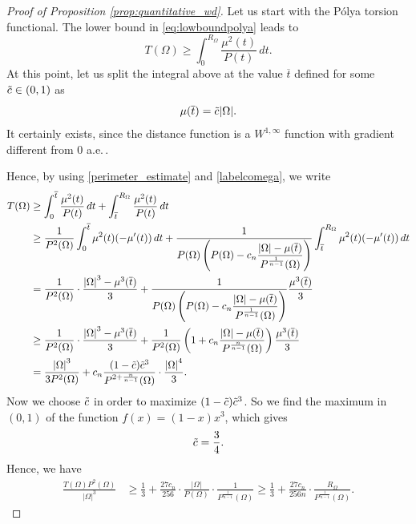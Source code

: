 \documentclass[oneside,a4paper,11pt,notitlepage]{article}
\newcommand{\abs}[1]{{\left|#1\right|}}
\theoremstyle{definition}
\theoremstyle{plain}
\theoremstyle{definition}
\begin{document}
 \begin{proof}[Proof of Proposition \ref{prop:quantitative_wd}]

Let us start with the P\'olya torsion functional.
 The lower bound in \eqref{eq:lowboundpolya} leads to 
\begin{equation*}
    T(\Omega) \geq \int_0^{R_\Omega}\frac{\mu^2(t)}{P(t)} \, dt.
\end{equation*}
At this point, let us split the integral above at the value $\overline{t}$ defined for some $\Tilde{c}\in (0,1)$ as
\begin{equation}
    \label{labelcomega}
    \mu(\overline{t})= \Tilde{c}\abs{\Omega}.
\end{equation}
It certainly exists, since the distance function is a $W^{1,\infty}$ function with gradient different from 0 a.e.\,.

Hence, by using \eqref{perimeter_estimate} and \eqref{labelcomega}, we write
\begin{align*}
    T(\Omega)&\geq \int_0^{\overline{t}}\frac{\mu^2(t)}{P(t)} \, dt+\int_{\overline{t}}^{R_\Omega}\frac{\mu^2(t)}{P(t)} \, dt \\
    &\geq  \frac{1}{P^2(\Omega)} \int_0^{\overline{t}}\mu^2(t)(-\mu'(t))\, dt+ \frac{1}{\displaystyle{P(\Omega)\left(P(\Omega) - c_n \frac{\abs{\Omega} - \mu(\overline{t})}{P^{\frac{1}{n-1}}(\Omega)}\right)}}\int_{\overline{t}}^{R_\Omega}\mu^2(t) (-\mu'(t))\, dt\\
    &= \frac{1}{P^2(\Omega)} \cdot\frac{\abs{\Omega}^3-\mu^3(\overline{t}) }{3}+ \frac{1}{\displaystyle{P(\Omega)\left(P(\Omega) - c_n \frac{\abs{\Omega} - \mu(\overline{t})}{P^{\frac{1}{n-1}}(\Omega)}\right)}} \frac{\mu^3(\overline{t}) }{3}\\
    & \geq \frac{1}{P^2(\Omega)} \cdot\frac{\abs{\Omega}^3-\mu^3(\overline{t}) }{3}+ \frac{1}{P^2(\Omega)}\left(1 +c_n\frac{\abs{\Omega} - \mu(\overline{t})}{P^{\frac{n}{n-1}}(\Omega)}\right) \frac{\mu^3(\overline{t}) }{3}\\
    &= \frac{\abs{\Omega}^3}{3P^2(\Omega)}+  c_n\frac{(1-\Tilde{c})\Tilde{c}^3}{P^{2+\frac{n}{n-1}}(\Omega)}\cdot\frac{\abs{\Omega}^4 }{3}.
\end{align*}
Now we choose $\Tilde{c}$ in order to maximize $(1-\Tilde{c})\Tilde{c}^3$. So we find the maximum in $(0,1)$ of the function $f(x)=(1-x)x^3$, which gives
\begin{equation*}
    \Tilde{c}= \frac{3}{4}.
\end{equation*}
Hence, we have
\begin{align}\label{eq:estimate1}
   \frac{ T(\Omega)P^2(\Omega)}{\abs{\Omega}^3}&\geq \frac{1}{3}+ \frac{27 c_n}{256} \cdot\frac{\abs{\Omega}}{P(\Omega)}\cdot\frac{1 }{P^{\frac{1}{n-1}}(\Omega)} \geq \frac{1}{3}+ \frac{27 c_n}{256n}\cdot\frac{R_\Omega}{P^{\frac{1}{n-1}}(\Omega)}.
\end{align}


\end{proof}
\end{document}
